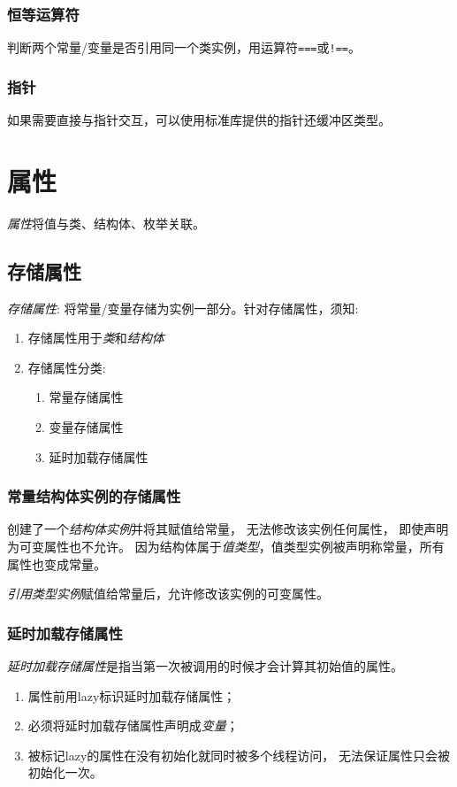 \documentclass{../main.tex}{subfiles}
\begin{document}
\subsubsection{恒等运算符}
判断两个常量/变量是否引用同一个类实例，用运算符\lstinline{===}或\lstinline{!==}。

\subsubsection{指针}
如果需要直接与指针交互，可以使用标准库提供的指针还缓冲区类型。

\section{属性}
\emph{属性}将值与类、结构体、枚举关联。



\subsection{存储属性}
\emph{存储属性}: 将常量/变量存储为实例一部分。针对存储属性，须知:
\begin{enumerate}[itemsep=0pt, parsep=0pt, topsep=0pt, partopsep=0pt]
  \item 存储属性用于\emph{类}和\emph{结构体}
  \item 存储属性分类:
    \begin{enumerate}[itemsep=0pt, parsep=0pt, topsep=0pt, partopsep=0pt]
      \item 常量存储属性
      \item 变量存储属性
      \item 延时加载存储属性
    \end{enumerate}
\end{enumerate}

\subsubsection{常量结构体实例的存储属性}
创建了一个\emph{结构体实例}并将其赋值给常量，
无法修改该实例任何属性，
即使声明为可变属性也不允许。
因为结构体属于\emph{值类型}，值类型实例被声明称常量，所有属性也变成常量。

\emph{引用类型实例}赋值给常量后，允许修改该实例的可变属性。

\subsubsection{延时加载存储属性}
\emph{延时加载存储属性}是指当第一次被调用的时候才会计算其初始值的属性。
\begin{enumerate}[itemsep=0pt, parsep=0pt, topsep=0pt, partopsep=0pt]
  \item 属性前用lazy标识延时加载存储属性；
  \item 必须将延时加载存储属性声明成\emph{变量}；
  \item 被标记lazy的属性在没有初始化就同时被多个线程访问，
    无法保证属性只会被初始化一次。
\end{enumerate}
\end{document}
